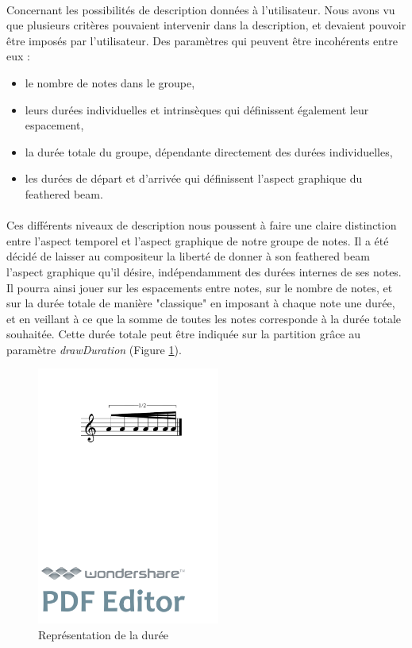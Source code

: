\documentclass[a4paper,10pt,twocolumn]{article}
\newenvironment{code}
  {\fontfamily{pnc}\selectfont}{}
\begin{document}
\paragraph{}
Concernant les possibilités de description données à l'utilisateur. Nous avons vu que plusieurs critères pouvaient intervenir dans la description, et devaient pouvoir être imposés par l'utilisateur. Des paramètres qui peuvent être incohérents entre eux :
\begin{itemize}
\item le nombre de notes dans le groupe,
\item leurs durées individuelles et intrinsèques qui définissent également leur espacement,
\item la durée totale du groupe, dépendante directement des durées individuelles,
\item les durées de départ et d'arrivée qui définissent l'aspect graphique du feathered beam.
\end{itemize}

\paragraph{}
Ces différents niveaux de description nous poussent à faire une claire distinction entre l'aspect temporel et l'aspect graphique de notre groupe de notes.  Il a été décidé de laisser au compositeur la liberté de donner à son feathered beam l'aspect graphique qu'il désire, indépendamment des durées internes de ses notes. Il pourra ainsi jouer sur les espacements entre notes, sur le nombre de notes, et sur la durée totale de manière "classique" en imposant à chaque note une durée, et en veillant à ce que la somme de toutes les notes corresponde à la durée totale souhaitée. Cette durée totale peut être indiquée sur la partition grâce au paramètre \textit{drawDuration} (Figure \ref{fig:fbeamduree}).

\begin{figure}[h]
\centering
\begin{code}
[ \textbackslash{}fBeam\textless{}drawDuration="true"\textgreater{}

( a/8 a a/16 a a a/32 a ) ]
\end{code}
\includegraphics[width=6cm]{img/fbeamduree.pdf}
\caption{Représentation de la durée}
\label{fig:fbeamduree}
\end{figure}
\end{document}
